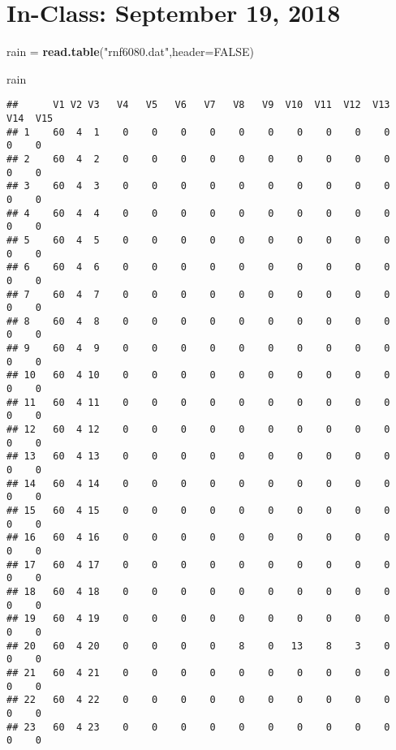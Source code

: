 \documentclass[]{article}
\title{}
\author{}
\date{}
\newenvironment{Shaded}{\begin{snugshade}}{\end{snugshade}}
\newcommand{\KeywordTok}[1]{\textcolor[rgb]{0.13,0.29,0.53}{\textbf{#1}}}
\newcommand{\DataTypeTok}[1]{\textcolor[rgb]{0.13,0.29,0.53}{#1}}
\newcommand{\StringTok}[1]{\textcolor[rgb]{0.31,0.60,0.02}{#1}}
\newcommand{\OtherTok}[1]{\textcolor[rgb]{0.56,0.35,0.01}{#1}}
\newcommand{\NormalTok}[1]{#1}
\begin{document}
\section{In-Class: September 19, 2018}\label{in-class-september-19-2018}

\begin{Shaded}
\begin{Highlighting}[]
\NormalTok{rain =}\StringTok{ }\KeywordTok{read.table}\NormalTok{(}\StringTok{"rnf6080.dat"}\NormalTok{,}\DataTypeTok{header=}\OtherTok{FALSE}\NormalTok{)}

\NormalTok{rain}
\end{Highlighting}
\end{Shaded}

\begin{verbatim}
##      V1 V2 V3   V4   V5   V6   V7   V8   V9  V10  V11  V12  V13  V14  V15
## 1    60  4  1    0    0    0    0    0    0    0    0    0    0    0    0
## 2    60  4  2    0    0    0    0    0    0    0    0    0    0    0    0
## 3    60  4  3    0    0    0    0    0    0    0    0    0    0    0    0
## 4    60  4  4    0    0    0    0    0    0    0    0    0    0    0    0
## 5    60  4  5    0    0    0    0    0    0    0    0    0    0    0    0
## 6    60  4  6    0    0    0    0    0    0    0    0    0    0    0    0
## 7    60  4  7    0    0    0    0    0    0    0    0    0    0    0    0
## 8    60  4  8    0    0    0    0    0    0    0    0    0    0    0    0
## 9    60  4  9    0    0    0    0    0    0    0    0    0    0    0    0
## 10   60  4 10    0    0    0    0    0    0    0    0    0    0    0    0
## 11   60  4 11    0    0    0    0    0    0    0    0    0    0    0    0
## 12   60  4 12    0    0    0    0    0    0    0    0    0    0    0    0
## 13   60  4 13    0    0    0    0    0    0    0    0    0    0    0    0
## 14   60  4 14    0    0    0    0    0    0    0    0    0    0    0    0
## 15   60  4 15    0    0    0    0    0    0    0    0    0    0    0    0
## 16   60  4 16    0    0    0    0    0    0    0    0    0    0    0    0
## 17   60  4 17    0    0    0    0    0    0    0    0    0    0    0    0
## 18   60  4 18    0    0    0    0    0    0    0    0    0    0    0    0
## 19   60  4 19    0    0    0    0    0    0    0    0    0    0    0    0
## 20   60  4 20    0    0    0    0    8    0   13    8    3    0    0    0
## 21   60  4 21    0    0    0    0    0    0    0    0    0    0    0    0
## 22   60  4 22    0    0    0    0    0    0    0    0    0    0    0    0
## 23   60  4 23    0    0    0    0    0    0    0    0    0    0    0    0

\end{verbatim}
\end{document}
